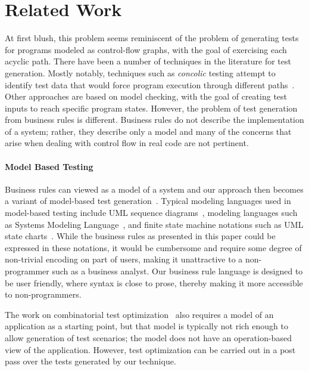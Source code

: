 \section{Related Work}
\label{sec:related}

At first blush, this problem seems reminiscent of the problem of generating
tests for programs modeled as control-flow graphs, with the goal of exercising
each acyclic path.  There have been a number of techniques in the literature for
test generation. Mostly notably, techniques such as \textit{concolic} testing
attempt to identify test data that would force program execution through
different paths~\cite{dart, concolic}.  Other approaches are based on model
checking, with the goal of creating test inputs to reach specific program
states.  However, the problem of test generation from business rules is
different. Business rules do not describe the implementation of a system;
rather, they describe only a model and many of the concerns that arise when
dealing with control flow in real code are not pertinent.

\paragraph*{Model Based Testing} Business rules can viewed as a model of a system
and our approach then becomes a variant of model-based test
generation~\cite{utting2012}. Typical modeling languages used in model-based
testing include UML sequence diagrams~\cite{nayak2009}, modeling
languages such as Systems Modeling Language~\cite{friedenthal2011}, and
finite state machine notations such as UML state charts~\cite{offhut99}. While
the business rules as presented in this paper could be expressed in these
notations, it would be cumbersome and require some degree of non-trivial
encoding on part of users, making it unattractive to a non-programmer such as a
business analyst. Our business rule language is designed to be user friendly,
where syntax is close to prose, thereby making it more accessible to
non-programmers.


The work on combinatorial test optimization~\cite{segall2012} also requires a model 
of an application as a starting point, but that model is typically not rich
enough to allow generation of test scenarios; the model does not have an operation-based
view of the application.   However, test optimization 
can be carried out in a post pass over the tests generated by our technique.

